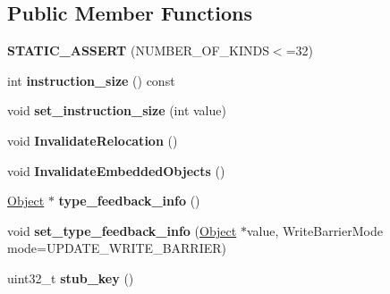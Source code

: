 \subsection*{Public Member Functions}
\begin{DoxyCompactItemize}
\item 
{\bfseries S\+T\+A\+T\+I\+C\+\_\+\+A\+S\+S\+E\+RT} (N\+U\+M\+B\+E\+R\+\_\+\+O\+F\+\_\+\+K\+I\+N\+DS$<$=32)\hypertarget{classv8_1_1internal_1_1_code_a8041d2825c0cb72a77c0e9d5d9ab2b95}{}\label{classv8_1_1internal_1_1_code_a8041d2825c0cb72a77c0e9d5d9ab2b95}

\item 
int {\bfseries instruction\+\_\+size} () const \hypertarget{classv8_1_1internal_1_1_code_a64a307fdd94b4f88bc9d5cd72ddc97f0}{}\label{classv8_1_1internal_1_1_code_a64a307fdd94b4f88bc9d5cd72ddc97f0}

\item 
void {\bfseries set\+\_\+instruction\+\_\+size} (int value)\hypertarget{classv8_1_1internal_1_1_code_ae7cbcbe577a5cc5fc05afed65bc1f2e1}{}\label{classv8_1_1internal_1_1_code_ae7cbcbe577a5cc5fc05afed65bc1f2e1}

\item 
void {\bfseries Invalidate\+Relocation} ()\hypertarget{classv8_1_1internal_1_1_code_a2b5f8b6232a03f5abdf614eb02ad4bab}{}\label{classv8_1_1internal_1_1_code_a2b5f8b6232a03f5abdf614eb02ad4bab}

\item 
void {\bfseries Invalidate\+Embedded\+Objects} ()\hypertarget{classv8_1_1internal_1_1_code_afd6545476f93acf9e3e4dfce8753c4df}{}\label{classv8_1_1internal_1_1_code_afd6545476f93acf9e3e4dfce8753c4df}

\item 
\hyperlink{classv8_1_1internal_1_1_object}{Object} $\ast$ {\bfseries type\+\_\+feedback\+\_\+info} ()\hypertarget{classv8_1_1internal_1_1_code_ad6d8f45df325424a3ae7793afed6996c}{}\label{classv8_1_1internal_1_1_code_ad6d8f45df325424a3ae7793afed6996c}

\item 
void {\bfseries set\+\_\+type\+\_\+feedback\+\_\+info} (\hyperlink{classv8_1_1internal_1_1_object}{Object} $\ast$value, Write\+Barrier\+Mode mode=U\+P\+D\+A\+T\+E\+\_\+\+W\+R\+I\+T\+E\+\_\+\+B\+A\+R\+R\+I\+ER)\hypertarget{classv8_1_1internal_1_1_code_aef2634ec3d04c0c444c9ece4b21bc4ff}{}\label{classv8_1_1internal_1_1_code_aef2634ec3d04c0c444c9ece4b21bc4ff}

\item 
uint32\+\_\+t {\bfseries stub\+\_\+key} ()\hypertarget{classv8_1_1internal_1_1_code_ace6405ba7f87cdd53bfc23c014aaa15c}{}\label{classv8_1_1internal_1_1_code_ace6405ba7f87cdd53bfc23c014aaa15c}


\end{DoxyCompactItemize}
